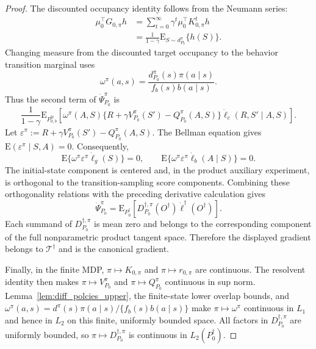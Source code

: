 \documentclass[12pt]{article}
\theoremstyle{remark}\newtheorem{remark}[theorem]{Remark}\theoremstyle{plain}
\newcommand{\E}{\mathrm{E}}
\begin{document}
\begin{proof}
    The discounted occupancy identity follows from the Neumann
    series:
    \[
        \begin{aligned}
        \mu_0^\top G_{0,\pi}h
        &=\sum_{t=0}^{\infty}\gamma^t
          \mu_0^\top K_{0,\pi}^t h\\
        &=\frac1{1-\gamma}
          \E_{S\sim d_{P_0}^\pi}\{h(S)\}.
        \end{aligned}
    \]
    Changing measure from the discounted target occupancy to the
    behavior transition marginal uses
    \[
        \omega^\pi(a,s)
        =\frac{d_{P_0}^\pi(s)\pi(a\mid s)}
        {f_b(s)b(a\mid s)}.
    \]
    Thus the second term of $\dot\Psi_{P_0}^\pi$ is
    \[
        \frac1{1-\gamma}
        \E_{P_{0,b}^{\mathrm{tr}}}\!\left[
        \omega^\pi(A,S)
        \{R+\gamma V_{P_0}^\pi(S')
        -Q_{P_0}^\pi(A,S)\}
        \dot\ell_c(R,S'\mid A,S)\right].
    \]
    Let
    $\varepsilon^\pi
      :=R+\gamma V_{P_0}^\pi(S')-Q_{P_0}^\pi(A,S)$.
    The Bellman equation gives
    $\E(\varepsilon^\pi\mid S,A)=0$.  Consequently,
    \[
        \E\{\omega^\pi\varepsilon^\pi\dot\ell_g(S)\}=0,
        \qquad
        \E\{\omega^\pi\varepsilon^\pi
        \dot\ell_b(A\mid S)\}=0.
    \]
    The initial-state component is centered and, in the product
    auxiliary experiment, is orthogonal to the transition-sampling
    score components.  Combining these orthogonality relations with
    the preceding derivative calculation gives
    \[
        \dot\Psi_{P_0}^{\pi}
        =\E_{P_0^\dagger}\!\left[
        D_{P_0}^{\dagger,\pi}(O^\dagger)
        \dot\ell^\dagger(O^\dagger)\right].
    \]
    Each summand of $D_{P_0}^{\dagger,\pi}$ is mean zero and belongs
    to the corresponding component of the full nonparametric product
    tangent space.  Therefore the displayed gradient belongs to
    $\mathcal T^\dagger$ and is the canonical gradient.

    Finally, in the finite MDP,
    $\pi\mapsto K_{0,\pi}$ and $\pi\mapsto r_{0,\pi}$ are continuous.
    The resolvent identity then makes
    $\pi\mapsto V_{P_0}^\pi$ and
    $\pi\mapsto Q_{P_0}^\pi$ continuous in sup norm.
    Lemma~\ref{lem:diff_polcies_upper}, the finite-state lower overlap
    bounds, and
    $\omega^\pi(a,s)
      =d^\pi(s)\pi(a\mid s)/\{f_b(s)b(a\mid s)\}$ make
    $\pi\mapsto\omega^\pi$ continuous in $L_1$ and hence in $L_2$
    on this finite, uniformly bounded space.  All factors in
    $D_{P_0}^{\dagger,\pi}$ are uniformly bounded, so
    $\pi\mapsto D_{P_0}^{\dagger,\pi}$ is continuous in
    $L_2(P_0^\dagger)$.
\end{proof}
\end{document}
